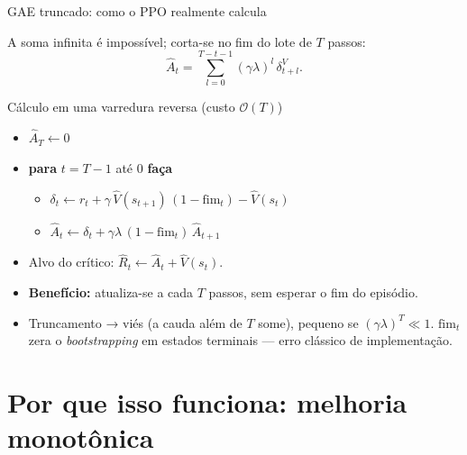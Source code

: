 \documentclass[aspectratio=169, 10pt]{beamer}
\newcommand{\Vhat}{\hat{V}}
\newcommand{\Ahat}{\hat{A}}
\begin{document}
\begin{frame}{GAE truncado: como o PPO realmente calcula}

  A soma infinita é impossível; corta-se no fim do lote de $T$ passos:
  \[
    \Ahat_t = \sum_{l=0}^{T-t-1}(\gamma\lambda)^l\,\delta^V_{t+l}.
  \]

  \begin{algbox}{Cálculo em uma varredura reversa (custo $\mathcal{O}(T)$)}
  \begin{itemize}\setlength{\itemsep}{0.1em}
    \item $\Ahat_{T} \leftarrow 0$
    \item \textbf{para} $t = T-1$ até $0$ \textbf{faça}
      \begin{itemize}
        \item $\delta_t \leftarrow r_t + \gamma\,\Vhat(s_{t+1})\,(1-\mathrm{fim}_t) - \Vhat(s_t)$
        \item $\Ahat_t \leftarrow \delta_t + \gamma\lambda\,(1-\mathrm{fim}_t)\,\Ahat_{t+1}$
      \end{itemize}
    \item Alvo do crítico: $\hat R_t \leftarrow \Ahat_t + \Vhat(s_t)$.
  \end{itemize}
  \end{algbox}

  \begin{itemize}\setlength{\itemsep}{0.2ex}
    \item \textbf{Benefício:} atualiza-se a cada $T$ passos, sem esperar o fim do episódio.
    \item Truncamento → viés (a cauda além de $T$ some), pequeno se
      $(\gamma\lambda)^{T}\ll1$. $\mathrm{fim}_t$ zera o \emph{bootstrapping} em
      estados terminais --- erro clássico de implementação.
  \end{itemize}
\end{frame}

\section{Por que isso funciona: melhoria monotônica}
\end{document}

